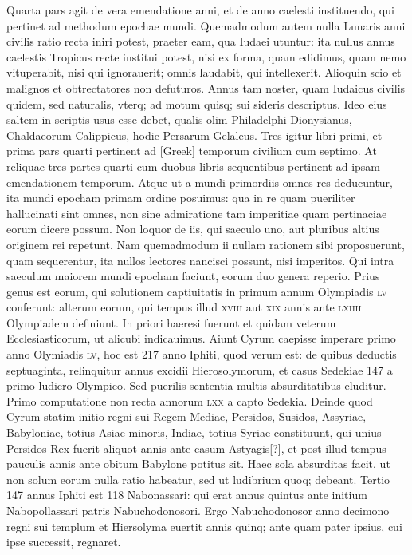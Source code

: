 Quarta pars agit de vera emendatione anni, et
de anno caelesti instituendo, qui pertinet ad methodum epochae
mundi.
Quemadmodum autem nulla Lunaris anni civilis ratio
recta iniri potest, praeter eam, qua Iudaei utuntur: ita nullus annus
caelestis Tropicus recte institui potest, nisi ex forma, quam edidimus,
quam nemo vituperabit, nisi qui ignorauerit; omnis laudabit,
qui intellexerit.
Alioquin scio et malignos et obtrectatores non defuturos. 
Annus tam noster, quam Iudaicus civilis quidem, sed naturalis,
vterq; ad motum quisq; sui sideris descriptus. 
Ideo eius saltem
in scriptis usus esse debet, qualis olim Philadelphi Dionysianus,
Chaldaeorum Calippicus, hodie Persarum Gelaleus. 
Tres igitur libri
primi, et prima pars quarti pertinent ad \textgreek{[Greek]} temporum civilium
cum septimo.
At reliquae tres partes quarti cum duobus libris
sequentibus pertinent ad ipsam emendationem temporum.
Atque
ut a mundi primordiis omnes res deducuntur, ita mundi epocham
primam ordine posuimus: qua in re quam pueriliter hallucinati sint
omnes, non sine admiratione tam imperitiae quam pertinaciae eorum
dicere possum.
Non loquor de iis, qui saeculo uno, aut pluribus altius
originem rei repetunt.
Nam quemadmodum ii nullam rationem
sibi proposuerunt, quam sequerentur, ita nullos lectores nancisci
possunt, nisi imperitos. 
Qui intra saeculum maiorem mundi
epocham faciunt, eorum duo genera reperio.
Prius genus est eorum,
qui solutionem captiuitatis in primum annum Olympiadis \textsc{lv} conferunt:
alterum eorum, qui tempus illud \textsc{xviii} aut \textsc{xix} annis ante
\textsc{lxiiii} Olympiadem definiunt.
In priori haeresi fuerunt et
quidam veterum Ecclesiasticorum, ut alicubi indicauimus. 
Aiunt
Cyrum caepisse imperare primo anno Olymiadis \textsc{lv}, hoc est 217
anno Iphiti, quod verum est: de quibus deductis septuaginta, relinquitur
annus excidii Hierosolymorum, et casus Sedekiae 147 a primo ludicro
Olympico.
Sed puerilis sententia multis absurditatibus eluditur.
Primo computatione non recta annorum \textsc{lxx} a capto Sedekia.
Deinde quod Cyrum statim initio regni sui Regem Mediae, Persidos,
Susidos, Assyriae, Babyloniae, totius Asiae minoris, Indiae, totius
Syriae constituunt, qui unius Persidos Rex fuerit aliquot annis ante
casum Astyagis[?], et post illud tempus pauculis annis ante obitum
Babylone potitus sit.
Haec sola absurditas facit, ut non solum eorum
nulla ratio habeatur, sed ut ludibrium quoq; debeant.
Tertio 147 annus
Iphiti est 118 Nabonassari: qui erat annus quintus ante initium Nabopollassari
patris Nabuchodonosori.
{}
Ergo Nabuchodonosor anno
decimono regni sui templum et Hiersolyma euertit annis quinq;
ante quam pater ipsius, cui ipse successit, regnaret.

